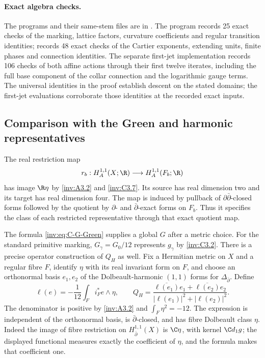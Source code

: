 \paragraph{Exact algebra checks.}
The programs and their same-stem  files are in
.
The program  records 25 exact checks of
the marking, lattice factors, curvature coefficients and regular
transition identities;  records 48
exact checks of the Cartier exponents, extending units, finite phases
and connection identities.  The separate first-jet implementation
 records 106 checks of both affine
actions through their first twelve iterates, including the full base
component of the collar connection and the logarithmic gauge terms.
The universal identities in the proof establish descent on the stated
domains; the first-jet evaluations corroborate those identities at the
recorded exact inputs.


\subsection{Comparison with the Green and harmonic representatives}
\label{inv:C3.8:operator-comparison}

The real restriction map
\[
r_b:H_A^{1,1}(X;\R)\longrightarrow H_A^{1,1}(F_b;\R)
\]
has image $\R\eta$ by \ref{inv:A3.2} and \ref{inv:C3.7}.  Its source has real dimension
two and its target has real dimension four.  The map is induced by pullback of $\partial\bar\partial$-closed forms followed by the quotient by $\partial$- and $\bar\partial$-exact forms on $F_b$. Thus it specifies the class of each restricted representative through that exact quotient map.

The formula \eqref{inv:eq:C-G-Green} supplies a global $G$ after a metric
choice.  For the standard primitive marking, $G_\gamma=G_0/12$
represents $g_\gamma$ by \ref{inv:C3.2}.  There is a precise operator
construction of $Q_H$ as well.  Fix a Hermitian metric on $X$ and a
regular fibre $F$, identify $\eta$ with its real invariant form on
$F$, and choose an orthonormal basis $e_1,e_2$ of the Dolbeault-harmonic
$(1,1)$ forms for $\Delta_{\bar\partial}$.  Define
\[
\ell(e)=-\frac1{12}\int_F i_F^*e\wedge\eta,\qquad
Q_H=\frac{\overline{\ell(e_1)}e_1+
            \overline{\ell(e_2)}e_2}
          {|\ell(e_1)|^2+|\ell(e_2)|^2}.
\]
The denominator is positive by \ref{inv:A3.2} and
$\int_F\eta^2=-12$.  The expression is independent of the
orthonormal basis, is $\bar\partial$-closed, and has fibre
Dolbeault class $\eta$.  Indeed the image of fibre restriction on
$H^{1,1}_{\bar\partial}(X)$ is $\C\eta$, with kernel
$\C d_1g$; the displayed functional measures exactly the coefficient
of $\eta$, and the formula makes that coefficient one.

